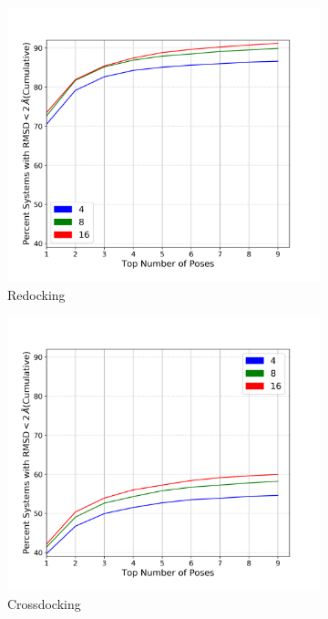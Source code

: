 \documentclass[journal=jcisd8,manuscript=article]{achemso}
\begin{document}
\begin{figure}    
        \begin{subfigure}[b]{0.48\textwidth}    
		\centering
		\includegraphics[width=\textwidth]{figures/redocking/sweep_exhaustiveness_line.png}
		\caption{Redocking}
		\label{fig:exhaustiveness rd}
        \end{subfigure}    
        \begin{subfigure}[b]{0.48\textwidth}    
		\centering
		\includegraphics[width=\textwidth]{figures/crossdocking/sweep_exhaustiveness_line.png}
		\caption{Crossdocking}
		\label{fig:exhaustiveness cd}
        \end{subfigure}    
	\caption{}
	\label{fig:exhaustiveness}
\end{figure}    
\end{document}
